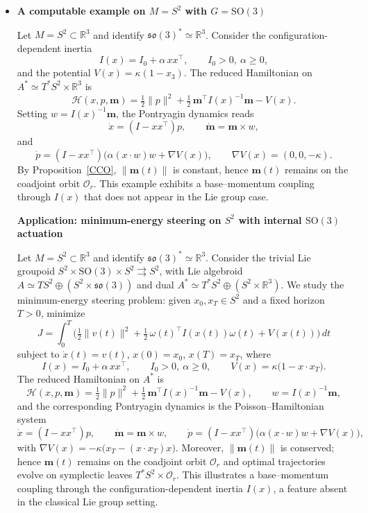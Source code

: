 \documentclass{article}
\newenvironment{proof}[1][Proof]{\noindent\textbf{#1.} }{\ \rule{0.5em}{0.5em}}
\begin{document}
\begin{itemize}
\begin{proof}
Differentiate $\|\mathbf m\|^2=\mathbf m\cdot \mathbf m$:
\[
\frac{d}{dt}\|\mathbf m\|^2 = 2\,\mathbf m\cdot \dot{\mathbf m}
=2\,\mathbf m\cdot (\mathbf m\times \Omega)=0,
\]
since $\mathbf m\times \Omega$ is orthogonal to $\mathbf m$. Hence $\|\mathbf m(t)\|$ is constant.
\end{proof}
\item{{\bf A computable example on $M=S^2$ with $G=\mathrm{SO}(3)$}}

Let $M=S^2\subset\mathbb R^3$ and identify $\mathfrak{so}(3)^*\simeq\mathbb R^3$.
Consider the configuration-dependent inertia
\[
I(x)=I_0+\alpha\, x x^\top,\qquad I_0>0,\ \alpha\ge 0,
\]
and the potential $V(x)=\kappa(1-x_3)$.
The reduced Hamiltonian on $A^*\simeq T^*S^2\times\mathbb R^3$ is
\[
\mathcal H(x,p,\mathbf m)=\tfrac12\|p\|^2+\tfrac12\,\mathbf m^\top I(x)^{-1}\mathbf m - V(x).
\]
Setting $w=I(x)^{-1}\mathbf m$, the Pontryagin dynamics reads
\[
\dot x = (I-xx^\top)p,\qquad
\dot{\mathbf m}=\mathbf m\times w,
\]
and
\[
\dot p = (I-xx^\top)\Big(\alpha(x\cdot w)w + \nabla V(x)\Big),
\qquad \nabla V(x)=(0,0,-\kappa).
\]
By Proposition~\ref{CCO}, $\|\mathbf m(t)\|$ is constant, hence $\mathbf m(t)$ remains on the coadjoint orbit $\mathcal O_r$.
This example exhibits a base--momentum coupling through $I(x)$ that does not appear in the Lie group case.

{\bf Application: minimum-energy steering on $S^2$ with internal $\mathrm{SO}(3)$ actuation}

Let $M=S^2\subset\mathbb R^3$ and identify $\mathfrak{so}(3)^*\simeq\mathbb R^3$.
Consider the trivial Lie groupoid $S^2\times \mathrm{SO}(3)\times S^2\rightrightarrows S^2$, with Lie algebroid
$A\simeq TS^2\oplus(S^2\times\mathfrak{so}(3))$ and dual $A^*\simeq T^*S^2\oplus(S^2\times\mathbb R^3)$.
We study the minimum-energy steering problem: given $x_0,x_T\in S^2$ and a fixed horizon $T>0$, minimize
\[
J=\int_0^T\Big(\tfrac12\|v(t)\|^2+\tfrac12\,\omega(t)^\top I(x(t))\omega(t)+V(x(t))\Big)\,dt
\]
subject to $\dot x(t)=v(t)$, $x(0)=x_0$, $x(T)=x_T$, where
\[
I(x)=I_0+\alpha\,x x^\top,\qquad I_0>0,\ \alpha\ge0,
\qquad
V(x)=\kappa\big(1-x\cdot x_T\big).
\]
The reduced Hamiltonian on $A^*$ is
\[
\mathcal H(x,p,\mathbf m)=\tfrac12\|p\|^2+\tfrac12\,\mathbf m^\top I(x)^{-1}\mathbf m - V(x),
\qquad w=I(x)^{-1}\mathbf m,
\]
and the corresponding Pontryagin dynamics is the Poisson--Hamiltonian system
\[
\dot x=(I-xx^\top)p,\qquad
\dot{\mathbf m}=\mathbf m\times w,\qquad
\dot p=(I-xx^\top)\Big(\alpha(x\cdot w)w + \nabla V(x)\Big),
\]
with $\nabla V(x)=-\kappa\big(x_T-(x\cdot x_T)x\big)$.
Moreover, $\|\mathbf m(t)\|$ is conserved; hence $\mathbf m(t)$ remains on the coadjoint orbit $\mathcal O_r$ and optimal trajectories evolve on symplectic leaves $T^*S^2\times\mathcal O_r$.
This illustrates a base--momentum coupling through the configuration-dependent inertia $I(x)$, a feature absent in the classical Lie group setting.


\end{itemize}
\end{document}
